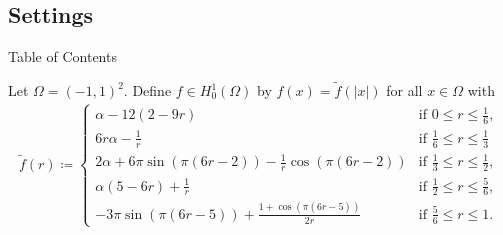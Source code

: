 \subsection{Settings}
\begin{frame}[noframenumbering]{Table of Contents}
\end{frame}


\begin{frame}
  Let $\Omega = (-1,1)^2$. Define $f\in H^1_0(\Omega)$ by 
  $f(x)=\tilde{f}(|x|)$ for all $x\in\Omega$ with
  \begin{align*}
    \tilde{f}(r)\coloneqq 
    \begin{cases}
      \alpha-12(2-9r) & \text{if } 0\leq r\leq\frac{1}{6},\\
      6r\alpha-\frac{1}{r} & \text{if } \frac{1}{6}\leq r\leq
      \frac{1}{3}\\
      2\alpha+6\pi\sin(\pi(6r-2))-\frac{1}{r}\cos(\pi(6r-2)) &
      \text{if } \frac{1}{3}\leq r\leq\frac{1}{2},\\
      \alpha(5-6r)+\frac{1}{r}&
      \text{if } \frac{1}{2}\leq r\leq\frac{5}{6},\\
      -3\pi\sin(\pi(6r-5))+\frac{1+\cos(\pi(6r-5))}{2r} &
      \text{if } \frac{5}{6}\leq r\leq 1.
    \end{cases}
  \end{align*}
  

\end{frame}
